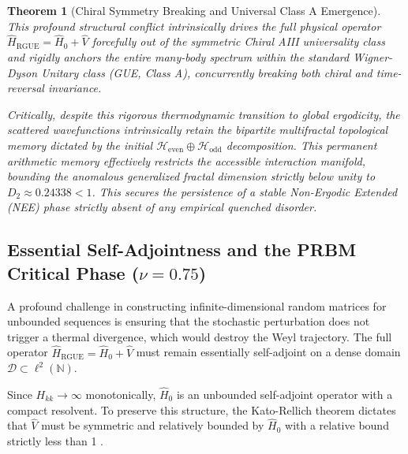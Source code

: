 \documentclass[aps,prl,preprint,superscriptaddress,floatfix]{revtex4-2}
\newtheorem{theorem}{Theorem}[section]
\newcommand{\N}{\mathbb{N}}
\newcommand{\Hilb}{\mathcal{H}}
\begin{document}
\begin{theorem}[Chiral Symmetry Breaking and Universal Class A Emergence]
This profound structural conflict intrinsically drives the full physical operator $\hat{H}_{\text{RGUE}} = \hat{H}_0 + \hat{V}$ forcefully out of the symmetric Chiral AIII universality class and rigidly anchors the entire many-body spectrum within the standard Wigner-Dyson Unitary class (GUE, Class A), concurrently breaking both chiral and time-reversal invariance.

Critically, despite this rigorous thermodynamic transition to global ergodicity, the scattered wavefunctions intrinsically retain the bipartite multifractal topological memory dictated by the initial $\Hilb_{\text{even}} \oplus \Hilb_{\text{odd}}$ decomposition. This permanent arithmetic memory effectively restricts the accessible interaction manifold, bounding the anomalous generalized fractal dimension strictly below unity to $D_2 \approx 0.24338 < 1$. This secures the persistence of a stable Non-Ergodic Extended (NEE) phase strictly absent of any empirical quenched disorder.
\end{theorem}

\subsection{Essential Self-Adjointness and the PRBM Critical Phase (\texorpdfstring{$\nu = 0.75$}{nu = 0.75})}

A profound challenge in constructing infinite-dimensional random matrices for unbounded sequences is ensuring that the stochastic perturbation does not trigger a thermal divergence, which would destroy the Weyl trajectory. The full operator $\hat{H}_{\text{RGUE}} = \hat{H}_0 + \hat{V}$ must remain essentially self-adjoint on a dense domain $\mathcal{D} \subset \ell^2(\N)$.

Since $H_{kk} \to \infty$ monotonically, $\hat{H}_0$ is an unbounded self-adjoint operator with a compact resolvent. To preserve this structure, the Kato-Rellich theorem dictates that $\hat{V}$ must be symmetric and relatively bounded by $\hat{H}_0$ with a relative bound strictly less than 1 \cite{ReedSimon1975}. 
\end{document}
